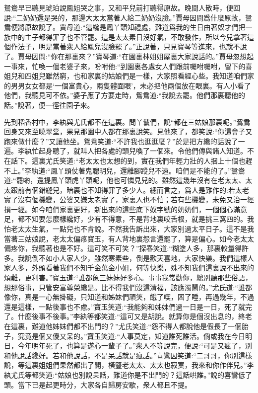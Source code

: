 \begin{parag}
    鴛鴦早已聽見琥珀說鳳姐哭之事，又和平兒前打聽得原故。晚間人散時，便回說:“二奶奶還是哭的，那邊大太太當著人給二奶奶沒臉。”賈母因問爲什麼原故，鴛鴦便將原故說了。賈母道:“這纔是鳳丫頭知禮處，難道爲我的生日由著奴才們把一族中的主子都得罪了也不管罷。這是太太素日沒好氣，不敢發作，所以今兒拿著這個作法子，明是當著衆人給鳳兒沒臉罷了。”正說著，只見寶琴等進來，也就不說了。賈母因問:“你在那裏來？”寶琴道:“在園裏林姐姐屋裏大家說話的。”賈母忽想起一事來，忙喚一個老婆子來，吩咐他:“到園裏各處女人們跟前囑咐囑咐，留下的喜姐兒和四姐兒雖然窮，也和家裏的姑娘們是一樣，大家照看經心些。我知道咱們家的男男女女都是‘一個富貴心，兩隻體面眼’，未必把他兩個放在眼裏。有人小看了他們，我聽見可不依。”婆子應了方要走時，鴛鴦道:“我說去罷。他們那裏聽他的話。”說著，便一徑往園子來。
\end{parag}


\begin{parag}
    先到稻香村中，李紈與尤氏都不在這裏。問丫鬟們，說“都在三姑娘那裏呢。”鴛鴦回身又來至曉翠堂，果見那園中人都在那裏說笑。見他來了，都笑說:“你這會子又跑來做什麼？”又讓他坐。鴛鴦笑道:“不許我也逛逛麼？”於是把方纔的話說了一遍。李紈忙起身聽了，就叫人把各處的頭兒喚了一個來。令他們傳與諸人知道。不在話下。這裏尤氏笑道:“老太太也太想的到，實在我們年輕力壯的人捆上十個也趕不上。”李紈道:“鳳丫頭仗著鬼聰明兒，還離腳蹤兒不遠。咱們是不能的了。”鴛鴦道:“罷喲，還提鳳丫頭虎丫頭呢，他也可憐見兒的。雖然這幾年沒有在老太太、太太跟前有個錯縫兒，暗裏也不知得罪了多少人。總而言之，爲人是難作的:若太老實了沒有個機變，公婆又嫌太老實了，家裏人也不怕；若有些機變，未免又治一經損一經。如今咱們家裏更好，新出來的這些底下奴字號的奶奶們，一個個心滿意足，都不知要怎麼樣纔好，少有不得意，不是背地裏咬舌根，就是挑三窩四的。我怕老太太生氣，一點兒也不肯說。不然我告訴出來，大家別過太平日子。這不是我當著三姑娘說，老太太偏疼寶玉，有人背地裏怨言還罷了，算是偏心。如今老太太偏疼你，我聽著也是不好。這可笑不可笑？”探春笑道:“糊塗人多，那裏較量得許多。我說倒不如小人家人少，雖然寒素些，倒是歡天喜地，大家快樂。我們這樣人家人多，外頭看著我們不知千金萬金小姐，何等快樂，殊不知我們這裏說不出來的煩難，更利害。”寶玉道:“誰都象三妹妹好多心。事事我常勸你，總別聽那些俗語，想那俗事，只管安富尊榮纔是。比不得我們沒這清福，該應濁鬧的。”尤氏道:“誰都像你，真是一心無掛礙，只知道和姊妹們頑笑，餓了喫，困了睡，再過幾年，不過還是這樣，一點後事也不慮。”寶玉笑道:“我能夠和姊妹們過一日是一日，死了就完了。什麼後事不後事。”李紈等都笑道:“這可又是胡說。就算你是個沒出息的，終老在這裏，難道他姊妹們都不出門的？”尤氏笑道:“怨不得人都說他是假長了一個胎子，究竟是個又傻又呆的。”寶玉笑道:“人事莫定，知道誰死誰活。倘或我在今日明日，今年明年死了，也算是遂心一輩子了。”衆人不等說完，便說:“可是又瘋了，別和他說話纔好。若和他說話，不是呆話就是瘋話。”喜鸞因笑道:“二哥哥，你別這樣說，等這裏姐姐們果然都出了閣，橫豎老太太、太太也寂寞，我來和你作伴兒。”李紈尤氏等都笑道:“姑娘也別說呆話，難道你是不出門的？這話哄誰。”說的喜鸞低了頭。當下已是起更時分，大家各自歸房安歇，衆人都且不提。
\end{parag}


